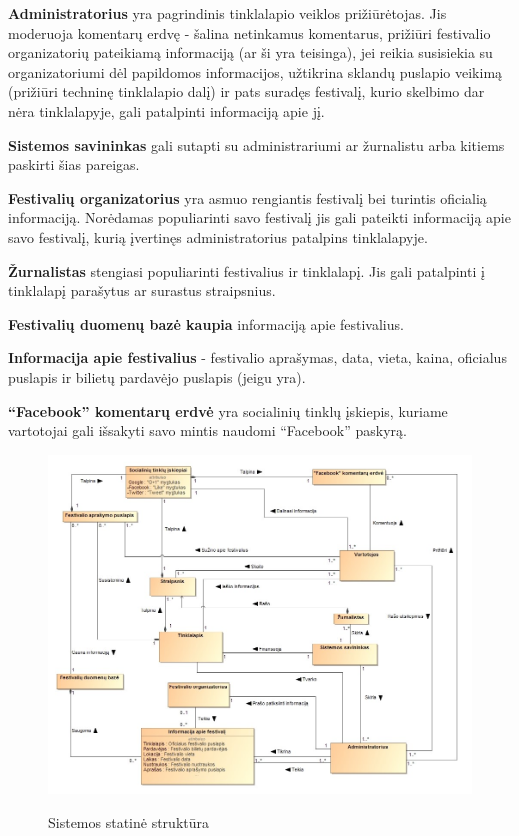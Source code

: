 \documentclass{VUMIFPSkursinis}
\begin{document}
\textbf{Administratorius} yra pagrindinis tinklalapio veiklos prižiūrėtojas.
Jis moderuoja komentarų erdvę - šalina netinkamus komentarus, prižiūri festivalio organizatorių pateikiamą informaciją (ar ši yra teisinga), jei reikia susisiekia su organizatoriumi dėl papildomos informacijos, užtikrina sklandų puslapio veikimą (prižiūri techninę tinklalapio dalį) ir pats suradęs festivalį, kurio skelbimo dar nėra tinklalapyje, gali patalpinti informaciją apie jį.

\textbf{Sistemos savininkas} gali sutapti su administrariumi ar žurnalistu arba kitiems paskirti šias pareigas.

\textbf{Festivalių organizatorius} yra asmuo rengiantis festivalį bei turintis oficialią informaciją. Norėdamas populiarinti savo festivalį jis gali pateikti informaciją apie savo festivalį, kurią įvertinęs administratorius patalpins tinklalapyje.

\textbf{Žurnalistas} stengiasi populiarinti festivalius ir tinklalapį. Jis gali patalpinti į tinklalapį parašytus ar surastus straipsnius.

\textbf{Festivalių duomenų bazė kaupia} informaciją apie festivalius.

\textbf{Informacija apie festivalius} - festivalio aprašymas, data, vieta, kaina, oficialus puslapis ir bilietų pardavėjo puslapis (jeigu yra).

\textbf{“Facebook” komentarų erdvė} yra socialinių tinklų įskiepis, kuriame vartotojai gali išsakyti savo mintis naudomi “Facebook” paskyrą.

\begin{figure}[H]
    \centering
    \includegraphics[scale=0.45]{img/geri/Statine_struktura}
    \label{img:uml1}
	\caption{Sistemos statinė struktūra}
\end{figure}
\end{document}
